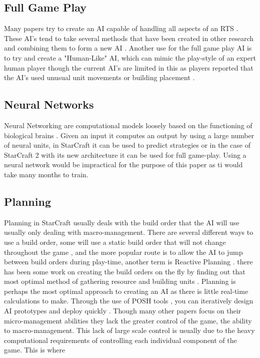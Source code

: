 \documentclass[journal]{IEEEtran}
\begin{document}
\subsection{Full Game Play}
Many papers try to create an AI capable of handling all aspects of an RTS \cite{Agents}\cite{Hierarchical}\cite{HumanLevel}\cite{SCAIL}. These AI's tend to take several methods that have been created in other research and combining them to form a new AI \cite{Agents}. Another use for the full game play AI is to try and create a "Human-Like" AI, which can mimic the play-style of an expert human player though the current AI's are limited in this as players reported that the AI's used unusual unit movements or building placement \cite{EvalHuman}.

\subsection{Neural Networks}
Neural Networking are computational models loosely based on the functioning of biological brains \cite{Deep}. Given an input it computes an output by using a large number of neural units, in StarCraft it can be used to predict strategies or in the case of StarCraft 2 with its new architecture it can be used for full game-play. Using a neural network would be impractical for the purpose of this paper as ti would take many months to train.

\subsection{Planning}
Planning in StarCraft usually deals with the build order that the AI will use usually only dealing with macro-management. There are several different ways to use a build order, some will use a static build order that will not change throughout the game \cite{Swen}, and the more popular route is to allow the AI to jump between build orders during play-time, another term is Reactive Planning \cite{Fuzzy}\cite{OnlineEvo}\cite{GoalDriven}. there has been some work on creating the build orders on the fly by finding out that most optimal method of gathering resource and building units \cite{BuildOrder}. Planning is perhaps the most optimal approach to creating an AI as there is little real-time calculations to make. Through the use of POSH tools \cite{POSH}, you can iteratively design AI prototypes and deploy quickly \cite{Swen}. Though many other papers focus on their micro-management abilities they lack the greater control of the game, the ability to macro-management. This lack of large scale control is usually due to the heavy computational requirements of controlling each individual component of the game. This is where 
\end{document}
